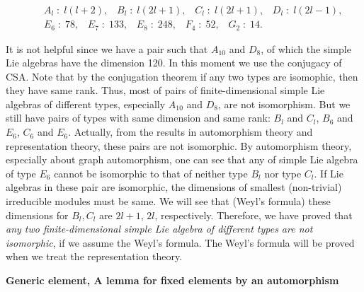 \documentclass{article}
\begin{document}
\begin{eqnarray*}
  &\;& A_l \;:\; l(l + 2), \;\;\; B_l \;:\; l(2l + 1), \;\;\; C_l \;:\; l(2l + 1), \;\;\; D_l \;:\; l(2l - 1), \\
  &\;& E_6 \;:\; 78, \;\;\; E_7 \;:\; 133, \;\;\; E_8 \;:\; 248, \;\;\; F_4 \;:\; 52, \;\;\; G_2 \;:\; 14.
\end{eqnarray*}

It is not helpful since we have a pair such that $A_{10}$ and $D_8$, of which the simple Lie algebras have the dimension 120.
In this moment we use the conjugacy of CSA.
Note that by the conjugation theorem if any two types are isomophic, then they have same rank.
Thus, most of pairs of finite-dimensional simple Lie algebras of different types, especially $A_{10}$ and $D_8$, are not isomorphism.
But we still have pairs of types with same dimension and same rank: $B_l$ and $C_l$, $B_6$ and $E_6$, $C_6$ and $E_6$.
Actually, from the results in automorphism theory and representation theory, these pairs are not isomorphic.
By automorphism theory, especially about graph automorphism, one can see that any of simple Lie algebra of type $E_6$ cannot be isomorphic to that of neither type $B_l$ nor type $C_l$.
If Lie algebras in these pair are isomorphic, the dimensions of smallest (non-trivial) irreducible modules must be same.
We will see that (Weyl's formula) these dimensions for $B_l, C_l$ are $2l + 1$, $2l$, respectively.
Therefore, we have proved that \textit{any two finite-dimensional simple Lie algebra of different types are not isomorphic}, if we assume the Weyl's formula.
The Weyl's formula will be proved when we treat the representation theory.

\newpage

\textbf{Generic element, A lemma for fixed elements by an automorphism}
\end{document}
